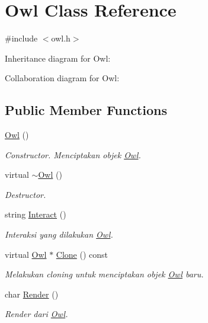 \hypertarget{classOwl}{}\section{Owl Class Reference}
\label{classOwl}


{\ttfamily \#include $<$owl.\+h$>$}



Inheritance diagram for Owl\+:


Collaboration diagram for Owl\+:
\subsection*{Public Member Functions}
\begin{DoxyCompactItemize}
\item 
\hyperlink{classOwl_a0a5c549eb9ac3099f04dbcea78c79f6a}{Owl} ()
\begin{DoxyCompactList}\small\item\em Constructor. Menciptakan objek \hyperlink{classOwl}{Owl}. \end{DoxyCompactList}\item 
virtual \hyperlink{classOwl_af8238b610fbfd53c4d3153fb2d993ab7}{$\sim$\+Owl} ()
\begin{DoxyCompactList}\small\item\em Destructor. \end{DoxyCompactList}\item 
string \hyperlink{classOwl_ac3c735f8a34b46780a0efd052319e7f3}{Interact} ()
\begin{DoxyCompactList}\small\item\em Interaksi yang dilakukan \hyperlink{classOwl}{Owl}. \end{DoxyCompactList}\item 
virtual \hyperlink{classOwl}{Owl} $\ast$ \hyperlink{classOwl_a585e73d53d76b2db489613b7f0b6eecc}{Clone} () const 
\begin{DoxyCompactList}\small\item\em Melakukan cloning untuk menciptakan objek \hyperlink{classOwl}{Owl} baru. \end{DoxyCompactList}\item 
char \hyperlink{classOwl_ab4ecc1fc8da822f97299709508f7806d}{Render} ()
\begin{DoxyCompactList}\small\item\em Render dari \hyperlink{classOwl}{Owl}. \end{DoxyCompactList}\end{DoxyCompactItemize}

